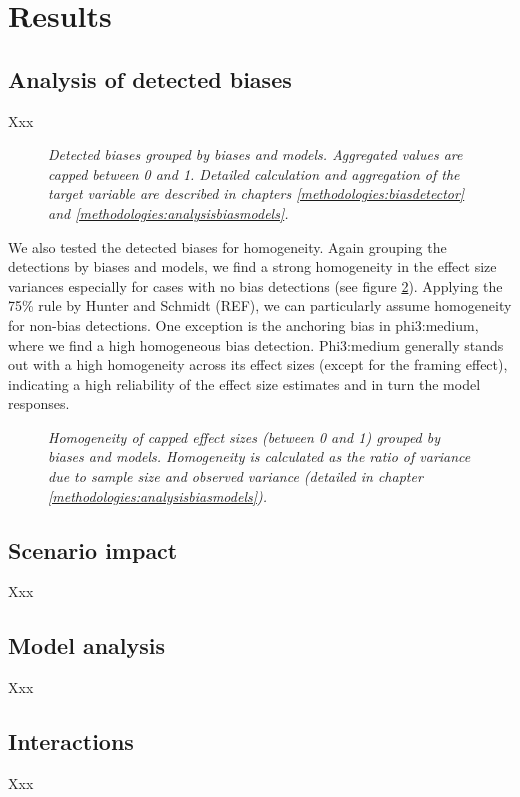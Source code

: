 \section{Results}
\subsection{Analysis of detected biases}
Xxx

\begin{figure}[htbp]
    \centering
    
    \caption[Heatmap of bias detections grouped by biases and models]{\centering \textit{Detected biases grouped by biases and models. Aggregated values are capped between 0 and 1. Detailed calculation and aggregation of the target variable are described in chapters \ref{methodologies:biasdetector} and \ref{methodologies:analysisbiasmodels}.}}
    \label{fig:detections-heatmap}
\end{figure}

\par We also tested the detected biases for homogeneity. Again grouping the detections by biases and models, we find a strong homogeneity in the effect size variances especially for cases with no bias detections (see figure \ref{fig:homogeneity-heatmap}). Applying the 75\% rule by Hunter and Schmidt (REF), we can particularly assume homogeneity for non-bias detections. One exception is the anchoring bias in phi3:medium, where we find a high homogeneous bias detection. Phi3:medium generally stands out with a high homogeneity across its effect sizes (except for the framing effect), indicating a high reliability of the effect size estimates and in turn the model responses. 

\begin{figure}[htbp]
    \centering
    
    \caption[Heatmap of homogeneity grouped by biases and models]{\centering \textit{Homogeneity of capped effect sizes (between 0 and 1) grouped by biases and models. Homogeneity is calculated as the ratio of variance due to sample size and observed variance (detailed in chapter \ref{methodologies:analysisbiasmodels}).}}
    \label{fig:homogeneity-heatmap}
\end{figure}

\subsection{Scenario impact}
Xxx

\subsection{Model analysis}
Xxx

\subsection{Interactions}
Xxx
